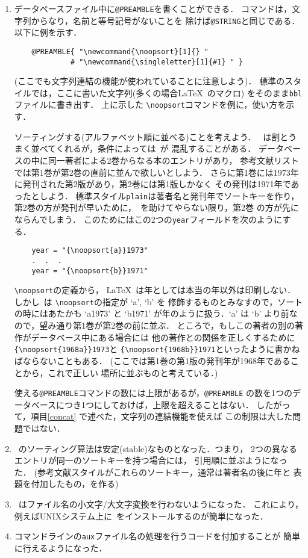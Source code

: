 \begin{enumerate}
\item
\label{preamble}
データベースファイル中に\verb|@PREAMBLE|を書くことができる．
コマンドは，文字列からなり，名前と等号記号がないことを
除けば\verb|@STRING|と同じである．以下に例を示す．
\begin{verbatim}
    @PREAMBLE{ "\newcommand{\noopsort}[1]{} "
             # "\newcommand{\singleletter}[1]{#1} " }
\end{verbatim}
(ここでも文字列連結の機能が使われていることに注意しよう)．
標準のスタイルでは，ここに書いた文字列(多くの場合\LaTeX\ のマクロ)
をそのまま{\tt bbl}ファイルに書き出す．
上に示した \verb|\noopsort|コマンドを例に，使い方を示す．

ソーティングする(アルファベット順に並べる)ことを考えよう．
\BibTeX\ は割とうまく並べてくれるが，条件によっては\BibTeX\ が
混乱することがある．
データベースの中に同一著者による2巻からなる本のエントリがあり，
参考文献リストでは第1巻が第2巻の直前に並んで欲しいとしよう．
さらに第1巻には1973年に発刊された第2版があり，第2巻には第1版しかなく
その発刊は1971年であったとしよう．
標準スタイル{\tt plain}は著者名と発刊年でソートキーを作り，
第2巻の方が発刊が早いために，\BibTeX\ を助けてやらない限り，第2巻
の方が先にならんでしまう．
このためにはこの2つの{\tt year}フィールドを次のようにする．
\begin{verbatim}
    year = "{\noopsort{a}}1973"
    .  .  .
    year = "{\noopsort{b}}1971"
\end{verbatim}
\verb|\noopsort|の定義から，
\LaTeX\ は年としては本当の年以外は印刷しない．
しかし\BibTeX\ は \verb|\noopsort|の指定が `a', `b' を
修飾するものとみなすので，ソートの時にはあたかも `a1973' と `b1971'
が年のように扱う．`a' は `b' より前なので，望み通り第1巻が第2巻の前に並ぶ．
ところで，もしこの著者の別の著作がデータベース中にある場合には
他の著作との関係を正しくするために\verb|{\noopsort{1968a}}1973|と
\verb|{\noopsort{1968b}}1971|といったように書かねばならないこともある．
(ここでは第1巻の第1版の発刊年が1968年であることから，これで正しい
場所に並ぶものと考えている．)

使える\verb|@PREAMBLE|コマンドの数には上限があるが，\verb|@PREAMBLE|
の数を1つのデータベースにつき1つにしておけば，上限を超えることはない．
したがって，項目\ref{concat} で述べた，文字列の連結機能を使えば
この制限は大した問題ではない．

\item
\BibTeX\ のソーティング算法は安定(stable)なものとなった．つまり，
2つの異なるエントリが同一のソートキーを持つ場合には，
引用順に並ぶようになった．
(参考文献スタイルがこれらのソートキー，通常は著者名の後に年と
表題を付加したもの，を作る)

\item
\BibTeX\ はファイル名の小文字/大文字変換を行わないようになった．
これにより，例えばUNIXシステム上に\BibTeX\ をインストールするのが簡単になった．

\item
コマンドラインの{\tt aux}ファイル名の処理を行うコードを付加することが
簡単に行えるようになった．

\end{enumerate}


